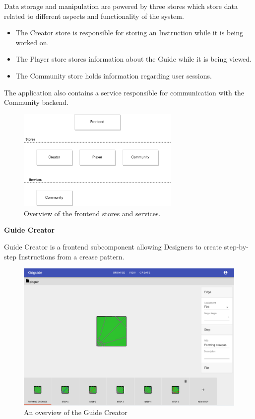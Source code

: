 Data storage and manipulation are powered by three stores which store data related to different aspects and functionality of the system.

\begin{itemize}
	\item The Creator store is responsible for storing an Instruction while it is being worked on.
	\item The Player store stores information about the Guide while it is being viewed.
	\item The Community store holds information regarding user sessions.
\end{itemize}

The application also contains a service responsible for communication with the Community backend.

\begin{figure}[H]
  \caption{Overview of the frontend stores and services.}
  \centering
    \includegraphics[width=0.7\textwidth]{assets/3-frontend-stores-services.png}
\end{figure}

\medskip


\textbf{Guide Creator}

\medskip

Guide Creator is a frontend subcomponent allowing Designers to create step-by-step Instructions from a crease pattern.


\begin{figure}[H]
  \caption{An overview of the Guide Creator}
  \centering
    \includegraphics[width=\textwidth]{assets/3-component-creator.png}
\end{figure}

